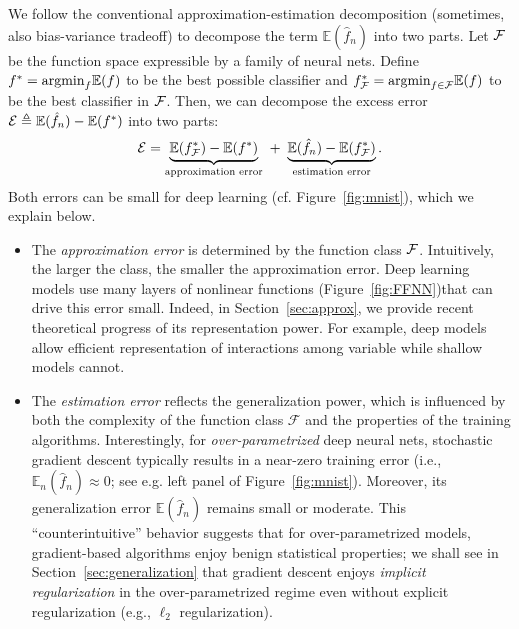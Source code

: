 We follow the conventional approximation-estimation decomposition (sometimes, also bias-variance tradeoff) to decompose the term $\mathbb{E}(\hat{f}_{n})$ into two parts.
Let $\mathcal{F}$ be the function space expressible by a family of neural nets.
Define $f^* = \mbox{argmin}_f \mathbb{E}(f)$ to be the best possible classifier and $f^*_{\mathcal{F}} = \mbox{argmin}_{f \in \mathcal{F}} \mathbb{E}(f)$ to be the best classifier in $\mathcal{F}$. Then, we can decompose the excess error $\mathcal{E} \triangleq \mathbb{E}(\hat f_n) - \mathbb{E}(f^*)$ into two parts:
\begin{equation}
\mathcal{E} = \underbrace{\mathbb{E}(f^*_{\mathcal{F}}) - \mathbb{E}(f^*)}_{\text{approximation error}} ~ + ~ \underbrace{\mathbb{E}(\hat f_n) - \mathbb{E}(f^*_{\mathcal{F}})}_{\text{estimation error}}.\label{eq:error_decomposition}
\end{equation}
Both errors can be small for deep learning (cf. Figure~\ref{fig:mnist}), which we explain below.
\begin{itemize}
\item{The \emph{approximation error} is determined by the function class $\mathcal{F}$. Intuitively, the larger the class, the smaller the approximation error. Deep learning models use many layers of nonlinear functions (Figure~\ref{fig:FFNN})that can drive this error small. Indeed, in Section~\ref{sec:approx}, we provide recent theoretical progress of its representation power. For example, deep models allow efficient representation of interactions among variable while shallow models cannot.
}
\item{The \emph{estimation error} reflects the generalization power, which is influenced by both the complexity of the function class $\mathcal{F}$ and the properties of the training algorithms. Interestingly, for \emph{over-parametrized} deep neural nets, stochastic gradient descent typically results in a near-zero  training error (i.e., $\mathbb{E}_{n}(\hat{f}_{n})\approx 0$; see e.g. left panel of Figure~\ref{fig:mnist}). Moreover, its generalization error $\mathbb{E}(\hat{f}_{n})$ remains small or moderate. This ``counterintuitive'' behavior suggests that for over-parametrized models, gradient-based algorithms enjoy benign statistical properties; we shall see in Section~\ref{sec:generalization} that gradient descent enjoys \textit{implicit regularization} in the over-parametrized regime even without explicit regularization (e.g., $\ell_2$ regularization).
}
\end{itemize}

